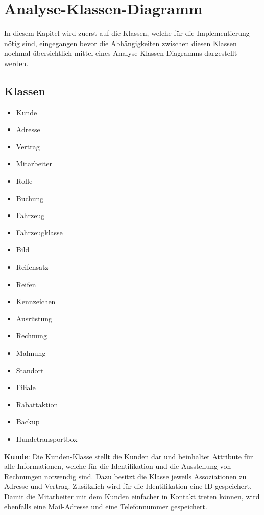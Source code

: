\chapter{Analyse-Klassen-Diagramm}

In diesem Kapitel wird zuerst auf die Klassen, welche für die Implementierung nötig sind, eingegangen bevor die Abhängigkeiten zwischen diesen Klassen nochmal übersichtlich mittel eines Analyse-Klassen-Diagramms dargestellt werden.

\section{Klassen}
\begin{multicols}{2}
\begin{itemize}
    \item Kunde
    \item Adresse
    \item Vertrag
    \item Mitarbeiter
    \item Rolle
    \item Buchung
    \item Fahrzeug
    \item Fahrzeugklasse
    \item Bild
    \item Reifensatz
    \item Reifen
    \item Kennzeichen
    \item Ausrüstung
    \item Rechnung
    \item Mahnung
    \item Standort
    \item Filiale
    \item Rabattaktion
    \item Backup
    \item Hundetransportbox
\end{itemize}
\end{multicols}

\newpage

\textbf{Kunde}: Die Kunden-Klasse stellt die Kunden dar und beinhaltet Attribute für alle Informationen, welche für die Identifikation und die Ausstellung von Rechnungen notwendig sind. Dazu besitzt die Klasse jeweils Assoziationen zu Adresse und Vertrag. Zusätzlich wird für die Identifikation eine ID gespeichert. Damit die Mitarbeiter mit dem Kunden einfacher in Kontakt treten können, wird ebenfalls eine Mail-Adresse und eine Telefonnummer gespeichert. 

